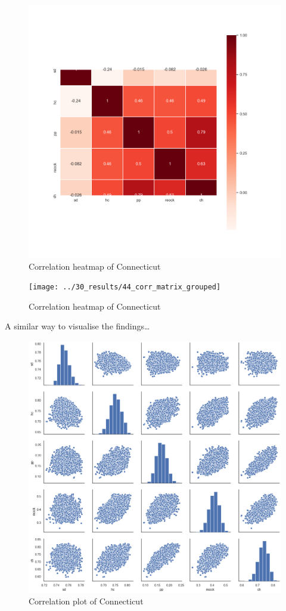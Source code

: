 \documentclass[]{article}
\begin{document}
\begin{figure}
\centering
\includegraphics{../30_results/09_corr_matrix_grouped}
\caption{Correlation heatmap of Connecticut}
\end{figure}

\begin{figure}
\centering
\texttt{[image: ../30\_results/44\_corr\_matrix\_grouped]}
\caption{Correlation heatmap of Connecticut}
\end{figure}

A similar way to visualise the findings\ldots{}

\begin{figure}
\centering
\includegraphics{../30_results/09_pairwise_plot_grouped.png}
\caption{Correlation plot of Connecticut\label{pairwise_plot_grouped}}
\end{figure}
\end{document}

